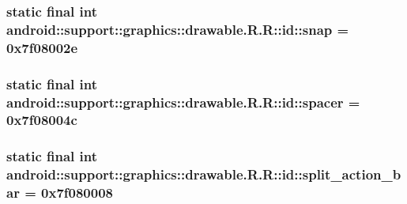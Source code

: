 \hypertarget{classandroid_1_1support_1_1graphics_1_1drawable_1_1_r_1_1id_25784502867f65c1fc35eb1f047ef50d}{
\subsubsection[{snap}]{\setlength{\rightskip}{0pt plus 5cm}static final int android::support::graphics::drawable.R.R::id::snap = 0x7f08002e}}
\label{classandroid_1_1support_1_1graphics_1_1drawable_1_1_r_1_1id_25784502867f65c1fc35eb1f047ef50d}


\hypertarget{classandroid_1_1support_1_1graphics_1_1drawable_1_1_r_1_1id_9fe8fd4eb516b1f4747abdeea48e3ddc}{
\subsubsection[{spacer}]{\setlength{\rightskip}{0pt plus 5cm}static final int android::support::graphics::drawable.R.R::id::spacer = 0x7f08004c}}
\label{classandroid_1_1support_1_1graphics_1_1drawable_1_1_r_1_1id_9fe8fd4eb516b1f4747abdeea48e3ddc}


\hypertarget{classandroid_1_1support_1_1graphics_1_1drawable_1_1_r_1_1id_a41d677a767054c3f5e9ffd235509363}{
\subsubsection[{split\_\-action\_\-bar}]{\setlength{\rightskip}{0pt plus 5cm}static final int android::support::graphics::drawable.R.R::id::split\_\-action\_\-bar = 0x7f080008}}
\label{classandroid_1_1support_1_1graphics_1_1drawable_1_1_r_1_1id_a41d677a767054c3f5e9ffd235509363}



